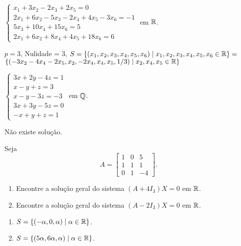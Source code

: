 \documentclass[12pt]{exam}
\begin{document}
\begin{exercicio}
  $
    \begin{cases}
      x_1 + 3x_2 - 2x_3 + 2x_5 = 0\\
      2x_1 + 6x_2 - 5x_3 - 2x_4 + 4x_5 - 3x_6 = -1\\
      5x_3 + 10x_4 + 15x_6 = 5\\
      2x_1 + 6x_2 + 8x_4 + 4x_5 + 18x_6 = 6
    \end{cases}
  $
  em $\mathbb{R}$.
  \begin{solucao}
    $p = 3$, Nulidade = 3, $S = \{(x_1, x_2, x_3, x_4, x_5, x_6) \mid x_1, x_2, x_3, x_4, x_5, x_6 \in \mathbb{R}\} = $\\ $\{(-3x_2 - 4x_4 - 2x_5, x_2, -2x_4, x_4, x_5, 1/3) \mid x_2, x_4, x_5 \in \mathbb{R}\}$
  \end{solucao}
\end{exercicio}

\begin{exercicio}\label{sistemalinearfim}
  $
    \begin{cases}
      3x + 2y - 4z = 1\\
      x - y + z = 3\\
      x - y - 3z = -3\\
      3x + 3y - 5z =0\\
      -x + y + z = 1
    \end{cases}
  $
  em $\mathbb{Q}$.
\begin{solucao}
  N\~ao existe solu\c{c}\~ao.
\end{solucao}
\end{exercicio}

\begin{exercicio}
  Seja
  \[
    A =\begin{bmatrix}
      1 & 0 & 5\\
      1 & 1 & 1\\
      0 & 1 & -4
    \end{bmatrix}.
  \]
  \begin{enumerate}[label={\alph*})]
    \item Encontre a solu\c{c}\~ao geral do sistema $(A + 4I_3)X = 0$ em $\mathbb{R}$.
    \item Encontre a solu\c{c}\~ao geral do sistema $(A - 2I_3)X = 0$ em $\mathbb{R}$.
  \end{enumerate}
  \begin{solucao}
    \begin{enumerate}[label={\alph*})]
      \item $S = \{(-\alpha, 0, \alpha) \mid \alpha \in \mathbb{R}\}$.
      \item $S = \{(5\alpha, 6\alpha, \alpha) \mid \alpha \in \mathbb{R}\}$.
    \end{enumerate}
  \end{solucao}
\end{exercicio}
\end{document}
